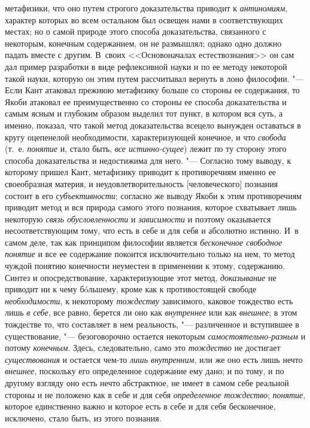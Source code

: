{{метафизики, что оно путем строгого доказательства приводит к
{\em антиномиям},
характер которых во всем остальном был освещен нами в
соответствующих местах; но о самой природе этого способа доказательства,
связанного с некоторым, конечным содержанием, он не размышлял; однако одно
должно падать вместе с другим. В~своих <<Основоначалах
естествознания>>
он сам дал пример разработки в виде рефлексивной науки и по
ее методу некоторой такой науки, которую он этим путем рассчитывал вернуть
в лоно философии. "--- Если Кант атаковал прежнюю метафизику
больше со стороны ее содержания, то Якоби атаковал ее преимущественно со
стороны ее способа доказательства и самым ясным и глубоким образом выделил
тот пункт, в котором вся суть, а именно, показал, что такой метод
доказательства всецело вынужден оставаться в кругу оцепенелой
необходимости, характеризующей конечное, и что
{\em свобода} (т.~е.
{\em понятие} и, стало
быть, {\em все
истинно-}{\em сущее})
лежит по ту сторону этого способа доказательства и
недостижима для него. "--- Согласно тому выводу, к которому
пришел Кант, метафизику приводит к противоречиям именно ее своеобразная
материя, и неудовлетворительность [человеческого] познания состоит в его
{\em субъективности};
согласно же выводу Якоби к этим противоречиям приводит метод
и вся природа самого этого познания, которое схватывает лишь некоторую
{\em связь обусловленности}
и {\em зависимости}
и поэтому оказывается несоответствующим тому, что есть в себе
и для себя и абсолютно истинно. И~в самом деле, так как принципом философии
является {\em бесконечное свободное
понятие} и все ее содержание покоится исключительно только
на нем, то метод чуждой понятию конечности неуместен в применении к этому,
содержанию. Синтез и опосредствование, характеризующие этот метод,
{\em доказывание} не
приводит ни к чему бóльшему, кроме как к противостоящей свободе
{\em необходимости}, к
некоторому {\em тождеству}
зависимого, каковое тождество есть лишь
{\em в себе}, все равно,
берется ли оно как {\em внутреннее}
или как {\em внешнее};
в этом тождестве то, что составляет в нем реальность, "---
различенное и вступившее в существование, "---
безоговорочно остается некоторым
{\em самостоятельно-разным}
и потому {\em конечным}.
Здесь, следовательно, само это
{\em тождество} не
достигает {\em существования}
и остается чем-то
{\em лишь внутренним},
или же оно есть лишь нечто
{\em внешнее}, поскольку
его определенное содержание ему дано; и по тому, и по другому взгляду оно
есть нечто абстрактное, не имеет в самом себе реальной стороны и не
положено как в себе и для себя
{\em определенное тождество};
{\em понятие}, которое
единственно важно и которое есть в себе и для себя бесконечное, исключено,
стало быть, из этого познания.

}}
